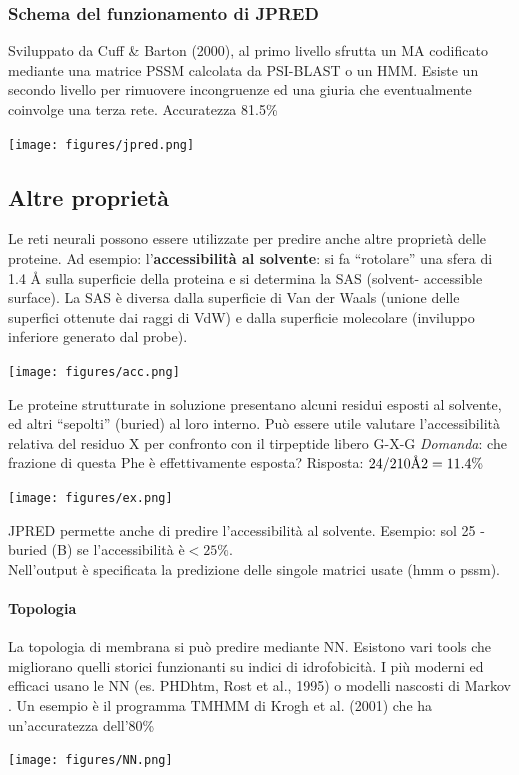 \documentclass{article}
\newcommand{\angstrom}{\mbox{\normalfont\AA}}
\begin{document}
\subsubsection{Schema del funzionamento di JPRED}
Sviluppato da Cuff \& Barton (2000), al primo livello sfrutta un MA
codificato mediante una matrice PSSM calcolata da PSI-BLAST o un
HMM. Esiste un secondo livello per rimuovere incongruenze ed una
giuria che eventualmente coinvolge una terza rete. Accuratezza 81.5\%
\begin{center}
    \texttt{[image: figures/jpred.png]}
\end{center}
\subsection{Altre proprietà}
Le reti neurali possono essere utilizzate per predire anche altre
proprietà delle proteine. Ad esempio:
l'\textbf{accessibilità al solvente}: si fa “rotolare” una sfera di 1.4 Å sulla
superficie della proteina e si determina la SAS (solvent-
accessible surface). La SAS è diversa dalla superficie di Van der
Waals (unione delle superfici ottenute dai raggi di VdW) e dalla
superficie molecolare (inviluppo inferiore generato dal probe).
\begin{center}
    \texttt{[image: figures/acc.png]}
\end{center}
Le proteine strutturate in soluzione presentano alcuni residui esposti
al solvente, ed altri “sepolti” (buried) al loro interno. Può essere utile
valutare l'accessibilità relativa del residuo X per confronto con il
tirpeptide libero G-X-G
\textit{Domanda}: che frazione di questa Phe è effettivamente esposta?
Risposta: $24/210 \angstrom 2 = 11.4\%$
\begin{center}
    \texttt{[image: figures/ex.png]}
\end{center}
JPRED permette anche di predire l'accessibilità al solvente.
Esempio: sol 25 - buried (B) se l'accessibilità è$ < 25\%$.\\
Nell'output è specificata la predizione delle singole matrici usate (hmm o
pssm).
\paragraph{Topologia}
La topologia di membrana si può predire mediante NN. Esistono vari
tools che migliorano quelli storici funzionanti su indici di idrofobicità. I
più moderni ed efficaci usano le NN (es. PHDhtm, Rost et al., 1995) o
modelli nascosti di Markov . Un esempio è il programma TMHMM di
Krogh et al. (2001) che ha un'accuratezza dell'80\%
\begin{center}
    \texttt{[image: figures/NN.png]}
\end{center}
\end{document}

